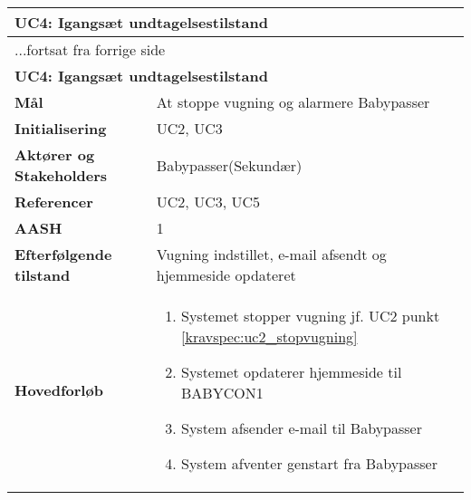 \begin{center} \centering \label{kravspec:uc4}
	\begin{longtable}{|p{5cm}|p{9cm}|}  %
	\hline
		\multicolumn{2}{|l|}{\textbf{UC4: Igangsæt undtagelsestilstand}} \\\hline %
		\endfirsthead
		
		\multicolumn{2}{l}{...fortsat fra forrige side} \\ \hline %
		\multicolumn{2}{|l|}{\textbf{UC4: Igangsæt undtagelsestilstand}} \\\hline %
		\endhead	
		
		\textbf{Mål}							&At stoppe vugning og alarmere Babypasser		\\\hline
		\textbf{Initialisering}				&UC2, UC3		\\\hline
		\textbf{Aktører og Stakeholders}		&Babypasser(Sekundær)	\\\hline 
		\textbf{Referencer}					&UC2, UC3, UC5		\\\hline
		\textbf{AASH}						&1		\\\hline
		\textbf{Efterfølgende tilstand}		&Vugning indstillet, e-mail afsendt og hjemmeside opdateret 		\\\hline
		\textbf{Hovedforløb}					
			&\begin{enumerate}
				
				\item Systemet stopper vugning jf. UC2 punkt \ref{kravspec:uc2_stopvugning} 							
				
				\item \label{kravspec:uc4_opdaterweb}Systemet opdaterer hjemmeside til BABYCON1				
				\newline [Und: \ref{kravspec:uc4_opdaterweb}.a Ingen netværksforbindelse]
				
				\item \label{kravspec:uc4_emailafsend}System afsender e-mail til Babypasser
				\newline [Und: \ref{kravspec:uc4_emailafsend}.a Ingen netværksforbindelse]
				
				\item System afventer genstart fra Babypasser
				

\end{enumerate}
\end{longtable}
\end{center}
